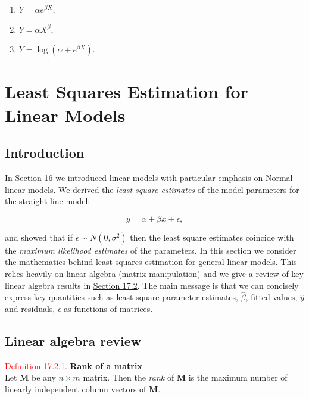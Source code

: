\documentclass[
]{book}
\providecommand{\tightlist}{%
  \setlength{\itemsep}{0pt}\setlength{\parskip}{0pt}}
\begin{document}
\begin{enumerate}
\def\labelenumi{(\alph{enumi})}
\tightlist
\item
  \(Y = \alpha e^{\beta X}\),\\
\item
  \(Y = \alpha X^{\beta}\),\\
\item
  \(Y = \log(\alpha+e^{\beta X})\).\\
\end{enumerate}

\hypertarget{Sec_Linear_LSE}{%
\chapter{Least Squares Estimation for Linear Models}\label{Sec_Linear_LSE}}

\hypertarget{Sec_Linear_LSE:intro}{%
\section{Introduction}\label{Sec_Linear_LSE:intro}}

In \protect\hyperlink{Sec_LinearI}{Section 16} we introduced linear models with particular emphasis on Normal linear models. We derived the \emph{least square estimates} of the model parameters for the straight line model:

\[ y = \alpha +  \beta x + \epsilon, \]

and showed that if \(\epsilon \sim N(0,\sigma^2)\) then the least square estimates coincide with the \emph{maximum likelihood estimates} of the parameters. In this section we consider the mathematics behind least squares estimation for general linear models. This relies heavily on linear algebra (matrix manipulation) and we give a review of key linear algebra results in \protect\hyperlink{Sec_Linear_LSE:algebra}{Section 17.2}. The main message is that we can concisely express key quantities such as least square parameter estimates, \(\hat{\beta}\), fitted values, \(\hat{y}\) and residuals, \(\epsilon\) as functions of matrices.

\hypertarget{Sec_Linear_LSE:algebra}{%
\section{Linear algebra review}\label{Sec_Linear_LSE:algebra}}

\leavevmode{}%
\textcolor{red}{Definition 17.2.1.}
{\textbf{Rank of a matrix}}\\
Let \(\mathbf{M}\) be any \(n \times m\) matrix. Then the \emph{rank} of \(\mathbf{M}\) is the maximum number of linearly independent column vectors of \(\mathbf{M}\).
\end{document}
